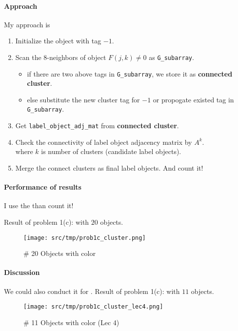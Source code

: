 \paragraph{Approach}
My approach is
\begin{enumerate}
    \item Initialize the object with tag \(-1\).
    \item Scan the \(8\)-neighbors of object \(F(j, k) \neq 0\) as \texttt{G\_subarray}.
	\begin{itemize}
	    \item if there are two above tags in \texttt{G\_subarray}, we store it as \textbf{connected cluster}.
	    \item else substitute the new cluster tag for \(-1\) or propogate existed tag in \texttt{G\_subarray}.
	\end{itemize}
    \item Get \texttt{label\_object\_adj\_mat} from \textbf{connected cluster}.
    \item Check the connectivity of label object adjacency matrix by \(A^{k}\). \\
	where \(k\) is number of clusters (candidate label objects).
    \item Merge the connect clusters as final label objects. And count it!
\end{enumerate}

\paragraph{Performance of results}
I use the  than count it!

Result of problem 1(c):  with \(20\) objects.
\begin{figure}
    \centering
    \texttt{[image: src/tmp/prob1c\_cluster.png]}
    \caption{\# 20 Objects with color}
    \label{prob1c_cluster}
\end{figure}

\paragraph{Discussion}
We could also conduct it for .
Result of problem 1(c):  with \(11\) objects.
\begin{figure}
    \centering
    \texttt{[image: src/tmp/prob1c\_cluster\_lec4.png]}
    \caption{\# 11 Objects with color (Lec 4)}
    \label{prob1c_cluster_lec4}
\end{figure}


